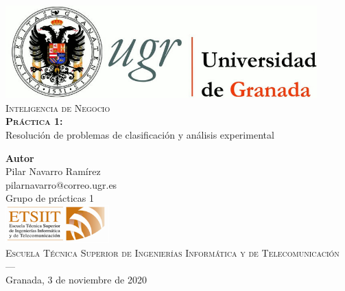 \begin{titlepage}
 
 
\newlength{\centeroffset}
\setlength{\centeroffset}{-0.5\oddsidemargin}
\addtolength{\centeroffset}{0.5\evensidemargin}
\thispagestyle{empty}

\noindent\hspace*{\centeroffset}\begin{minipage}{\textwidth}

\centering
\includegraphics[width=0.9\textwidth]{img/logo_ugr.jpg}\\[2cm]

\textsc{ \Huge Inteligencia de Negocio\\[1.5cm]}
\textbf{\textsc{ \huge Práctica 1:}}\\
 \huge Resolución de problemas de clasificación y análisis
	experimental\\[1cm]
% 
\end{minipage}

\vspace{2cm}
\noindent\hspace*{\centeroffset}\begin{minipage}{\textwidth}
\centering

\textbf{Autor}\\[0.2cm] {Pilar Navarro Ramírez}\\[0.2cm]
pilarnavarro@correo.ugr.es \\[0.2cm]
Grupo de prácticas 1 \\[1cm]

\includegraphics[width=0.3\textwidth]{img/etsiit_logo.png}\\[0.1cm]
\textsc{Escuela Técnica Superior de Ingenierías Informática y de Telecomunicación}\\
\textsc{---}\\
Granada, 3 de noviembre de 2020
\end{minipage}
\end{titlepage}


